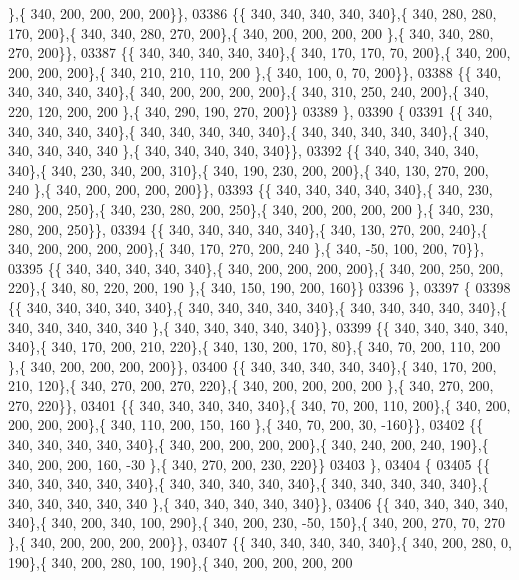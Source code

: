 \begin{DoxyCode}
      \},\{ 340, 200, 200, 200, 200\}\},
03386 \{\{ 340, 340, 340, 340, 340\},\{ 340, 280, 280, 170, 200\},\{ 340, 340, 280, 270, 200\},\{ 340, 200, 200, 200, 200
      \},\{ 340, 340, 280, 270, 200\}\},
03387 \{\{ 340, 340, 340, 340, 340\},\{ 340, 170, 170,  70, 200\},\{ 340, 200, 200, 200, 200\},\{ 340, 210, 210, 110, 200
      \},\{ 340, 100,   0,  70, 200\}\},
03388 \{\{ 340, 340, 340, 340, 340\},\{ 340, 200, 200, 200, 200\},\{ 340, 310, 250, 240, 200\},\{ 340, 220, 120, 200, 200
      \},\{ 340, 290, 190, 270, 200\}\}
03389 \},
03390 \{
03391 \{\{ 340, 340, 340, 340, 340\},\{ 340, 340, 340, 340, 340\},\{ 340, 340, 340, 340, 340\},\{ 340, 340, 340, 340, 340
      \},\{ 340, 340, 340, 340, 340\}\},
03392 \{\{ 340, 340, 340, 340, 340\},\{ 340, 230, 340, 200, 310\},\{ 340, 190, 230, 200, 200\},\{ 340, 130, 270, 200, 240
      \},\{ 340, 200, 200, 200, 200\}\},
03393 \{\{ 340, 340, 340, 340, 340\},\{ 340, 230, 280, 200, 250\},\{ 340, 230, 280, 200, 250\},\{ 340, 200, 200, 200, 200
      \},\{ 340, 230, 280, 200, 250\}\},
03394 \{\{ 340, 340, 340, 340, 340\},\{ 340, 130, 270, 200, 240\},\{ 340, 200, 200, 200, 200\},\{ 340, 170, 270, 200, 240
      \},\{ 340, -50, 100, 200,  70\}\},
03395 \{\{ 340, 340, 340, 340, 340\},\{ 340, 200, 200, 200, 200\},\{ 340, 200, 250, 200, 220\},\{ 340,  80, 220, 200, 190
      \},\{ 340, 150, 190, 200, 160\}\}
03396 \},
03397 \{
03398 \{\{ 340, 340, 340, 340, 340\},\{ 340, 340, 340, 340, 340\},\{ 340, 340, 340, 340, 340\},\{ 340, 340, 340, 340, 340
      \},\{ 340, 340, 340, 340, 340\}\},
03399 \{\{ 340, 340, 340, 340, 340\},\{ 340, 170, 200, 210, 220\},\{ 340, 130, 200, 170,  80\},\{ 340,  70, 200, 110, 200
      \},\{ 340, 200, 200, 200, 200\}\},
03400 \{\{ 340, 340, 340, 340, 340\},\{ 340, 170, 200, 210, 120\},\{ 340, 270, 200, 270, 220\},\{ 340, 200, 200, 200, 200
      \},\{ 340, 270, 200, 270, 220\}\},
03401 \{\{ 340, 340, 340, 340, 340\},\{ 340,  70, 200, 110, 200\},\{ 340, 200, 200, 200, 200\},\{ 340, 110, 200, 150, 160
      \},\{ 340,  70, 200,  30, -160\}\},
03402 \{\{ 340, 340, 340, 340, 340\},\{ 340, 200, 200, 200, 200\},\{ 340, 240, 200, 240, 190\},\{ 340, 200, 200, 160, -30
      \},\{ 340, 270, 200, 230, 220\}\}
03403 \},
03404 \{
03405 \{\{ 340, 340, 340, 340, 340\},\{ 340, 340, 340, 340, 340\},\{ 340, 340, 340, 340, 340\},\{ 340, 340, 340, 340, 340
      \},\{ 340, 340, 340, 340, 340\}\},
03406 \{\{ 340, 340, 340, 340, 340\},\{ 340, 200, 340, 100, 290\},\{ 340, 200, 230, -50, 150\},\{ 340, 200, 270,  70, 270
      \},\{ 340, 200, 200, 200, 200\}\},
03407 \{\{ 340, 340, 340, 340, 340\},\{ 340, 200, 280,   0, 190\},\{ 340, 200, 280, 100, 190\},\{ 340, 200, 200, 200, 200

\end{DoxyCode}
